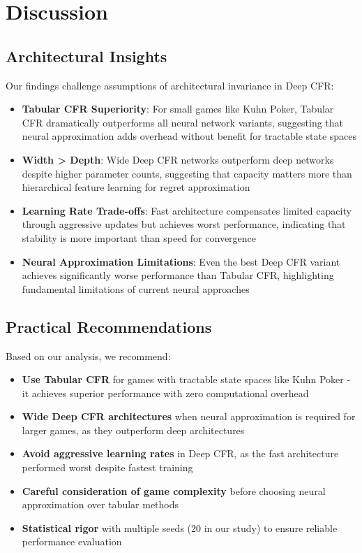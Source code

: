 \documentclass{article}
\begin{document}
\section{Discussion}

\subsection{Architectural Insights}

Our findings challenge assumptions of architectural invariance in Deep CFR:

\begin{itemize}
\item \textbf{Tabular CFR Superiority}: For small games like Kuhn Poker, Tabular CFR dramatically outperforms all neural network variants, suggesting that neural approximation adds overhead without benefit for tractable state spaces
\item \textbf{Width > Depth}: Wide Deep CFR networks outperform deep networks despite higher parameter counts, suggesting that capacity matters more than hierarchical feature learning for regret approximation
\item \textbf{Learning Rate Trade-offs}: Fast architecture compensates limited capacity through aggressive updates but achieves worst performance, indicating that stability is more important than speed for convergence
\item \textbf{Neural Approximation Limitations}: Even the best Deep CFR variant achieves significantly worse performance than Tabular CFR, highlighting fundamental limitations of current neural approaches
\end{itemize}

\subsection{Practical Recommendations}

Based on our analysis, we recommend:

\begin{itemize}
\item \textbf{Use Tabular CFR} for games with tractable state spaces like Kuhn Poker - it achieves superior performance with zero computational overhead
\item \textbf{Wide Deep CFR architectures} when neural approximation is required for larger games, as they outperform deep architectures
\item \textbf{Avoid aggressive learning rates} in Deep CFR, as the fast architecture performed worst despite fastest training
\item \textbf{Careful consideration of game complexity} before choosing neural approximation over tabular methods
\item \textbf{Statistical rigor} with multiple seeds (20 in our study) to ensure reliable performance evaluation
\end{itemize}
\end{document}
